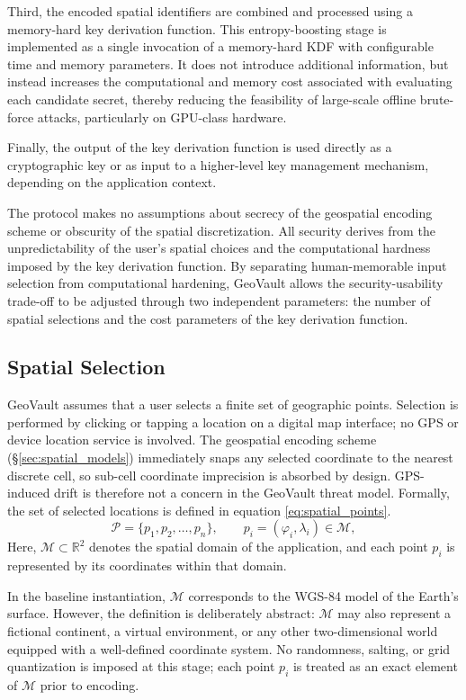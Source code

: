 \documentclass[journal,article,submit,pdftex,moreauthors]{Definitions/mdpi}
\newcommand{\add}[1]{#1}
\newcommand{\add}[1]{\added{#1}}
\begin{document}
Third, the encoded spatial identifiers are combined and processed using a memory-hard key derivation function. This entropy-boosting stage is implemented as a single invocation of a memory-hard KDF with configurable time and memory parameters. It does not introduce additional information, but instead increases the computational and memory cost associated with evaluating each candidate secret, thereby reducing the feasibility of large-scale offline brute-force attacks, particularly on GPU-class hardware.

Finally, the output of the key derivation function is used directly as a cryptographic key or as input to a higher-level key management mechanism, depending on the application context.

The protocol makes no assumptions about secrecy of the geospatial encoding scheme or obscurity of the spatial discretization. All security derives from the unpredictability of the user’s spatial choices and the computational hardness imposed by the key derivation function. By separating human-memorable input selection from computational hardening, GeoVault allows the security-usability trade-off to be adjusted through two independent parameters: the number of spatial selections and the cost parameters of the key derivation function.


\subsection{Spatial Selection}

GeoVault assumes that a user selects a finite set of geographic points. \add{Selection is performed by clicking or tapping a location on a digital map interface; no GPS or device location service is involved. The geospatial encoding scheme (\S\ref{sec:spatial_models}) immediately snaps any selected coordinate to the nearest discrete cell, so sub-cell coordinate imprecision is absorbed by design. GPS-induced drift is therefore not a concern in the GeoVault threat model.} Formally, the set of selected locations is defined in equation \ref{eq:spatial_points}.
\begin{equation}
    \mathcal{P} = \{p_1, p_2, \dots, p_n\}, \qquad p_i = (\varphi_i, \lambda_i) \in \mathcal{M},
    \label{eq:spatial_points}
\end{equation}
Here, $\mathcal{M} \subset \mathbb{R}^2$ denotes the spatial domain of the application, and each point $p_i$ is represented by its coordinates within that domain.

In the baseline instantiation, $\mathcal{M}$ corresponds to the WGS-84 model of the Earth’s surface. However, the definition is deliberately abstract: $\mathcal{M}$ may also represent a fictional continent, a virtual environment, or any other two-dimensional world equipped with a well-defined coordinate system. No randomness, salting, or grid quantization is imposed at this stage; each point $p_i$ is treated as an exact element of $\mathcal{M}$ prior to encoding.
\end{document}
